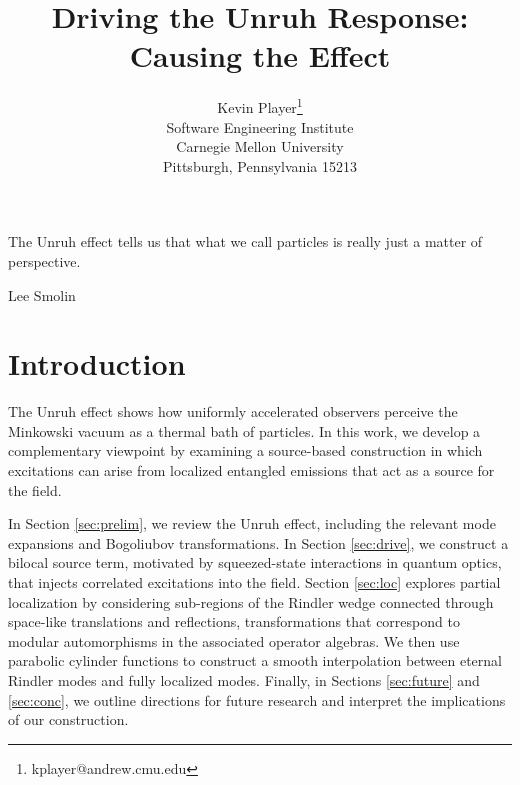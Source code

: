 \documentclass[12pt,a4paper]{article}
\begin{document}
\title{Driving the Unruh Response: Causing the Effect}
\author[1]{Kevin Player\footnote{kplayer@andrew.cmu.edu} \\ {\small Software Engineering Institute} \\ {\small Carnegie Mellon University} \\ {\small Pittsburgh, Pennsylvania 15213}}

\maketitle

\epigraph{The Unruh effect tells us that what we call particles is really just a matter of perspective.}{Lee Smolin}



\section{Introduction}
The Unruh effect\cite{unruh1976notes} shows how uniformly accelerated observers perceive the  Minkowski vacuum as a thermal bath of particles. In this work, we develop a complementary viewpoint by examining a source-based construction in which excitations can arise from localized entangled emissions that act as a source for the field.


In Section \ref{sec:prelim}, we review the Unruh effect, including the relevant mode expansions and Bogoliubov transformations. In Section \ref{sec:drive}, we construct a bilocal source term, motivated by squeezed-state interactions in quantum optics, that injects correlated excitations into the field. Section \ref{sec:loc} explores partial localization by considering sub-regions of the Rindler wedge connected through space-like translations and reflections, transformations that correspond to modular automorphisms in the associated operator algebras. We then use parabolic cylinder functions to construct a smooth interpolation between eternal Rindler modes and fully localized modes. Finally, in Sections \ref{sec:future} and \ref{sec:conc}, we outline directions for future research and interpret the implications of our construction.
\end{document}
